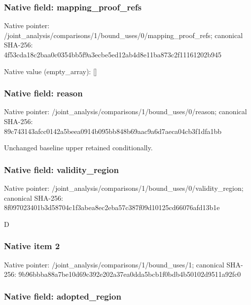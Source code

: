\documentclass[10pt,a4paper]{article}
\begin{document}
\subsubsection{Native field: mapping\_proof\_refs}


Native pointer: /joint\_analysis/comparis\allowbreak{}ons/1/bound\_uses/0/mappi\allowbreak{}ng\_proof\_refs; canonical SHA-256: 4f53cda18c2baa0c0354bb5f\allowbreak{}9a3ecbe5ed12ab4d8e11ba87\allowbreak{}3c2f11161202b945



Native value (empty\_array): []



\subsubsection{Native field: reason}


Native pointer: /joint\_analysis/comparis\allowbreak{}ons/1/bound\_uses/0/reaso\allowbreak{}n; canonical SHA-256: 89c743143afcc0142a5beea0\allowbreak{}914b095bb848b69aac9a6d7a\allowbreak{}eca04cb3f1dfa1bb


Unchanged baseline upper retained conditionally.


\subsubsection{Native field: validity\_region}


Native pointer: /joint\_analysis/comparis\allowbreak{}ons/1/bound\_uses/0/valid\allowbreak{}ity\_region; canonical SHA-256: 8f097023401b3d58704c1f3a\allowbreak{}bea8ec2eba57c387f09d1012\allowbreak{}5cd66076afd13b1e


D


\subsubsection{Native item 2}


Native pointer: /joint\_analysis/comparis\allowbreak{}ons/1/bound\_uses/1; canonical SHA-256: 9b96bbba88a7be10d69c392e\allowbreak{}202a37ea0dda5bcb1f0bdb4b\allowbreak{}50102d9511a92fc0



\subsubsection{Native field: adopted\_region}
\end{document}
